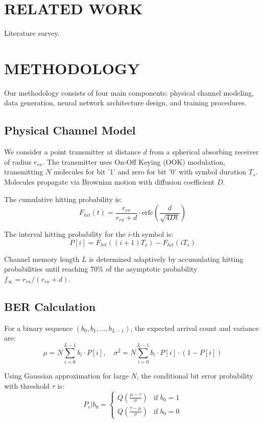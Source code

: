 \documentclass[a4paper,12pt]{report}
\begin{document}
\chapter{RELATED WORK}
Literature survey.

\chapter{METHODOLOGY}

Our methodology consists of four main components: physical channel modeling, data generation, neural network architecture design, and training procedures.

\section{Physical Channel Model}

We consider a point transmitter at distance $d$ from a spherical absorbing receiver of radius $r_{rx}$. The transmitter uses On-Off Keying (OOK) modulation, transmitting $N$ molecules for bit '1' and zero for bit '0' with symbol duration $T_s$. Molecules propagate via Brownian motion with diffusion coefficient $D$.

The cumulative hitting probability is:
\begin{equation}
F_{hit}(t) = \frac{r_{rx}}{r_{rx} + d} \cdot \text{erfc}\left(\frac{d}{\sqrt{4Dt}}\right)
\end{equation}

The interval hitting probability for the $i$-th symbol is:
\begin{equation}
P[i] = F_{hit}((i+1)T_s) - F_{hit}(iT_s)
\end{equation}

Channel memory length $L$ is determined adaptively by accumulating hitting probabilities until reaching 70\% of the asymptotic probability $f_{\infty} = r_{rx}/(r_{rx} + d)$.

\section{BER Calculation}

For a binary sequence $(b_0, b_1, \ldots, b_{L-1})$, the expected arrival count and variance are:
\begin{equation}
\mu = N \sum_{i=0}^{L-1} b_i \cdot P[i], \quad \sigma^2 = N \sum_{i=0}^{L-1} b_i \cdot P[i] \cdot (1 - P[i])
\end{equation}

Using Gaussian approximation for large $N$, the conditional bit error probability with threshold $\tau$ is:
\begin{equation}
P_e | b_0 =
\begin{cases}
Q\left(\frac{\mu - \tau}{\sigma}\right) & \text{if } b_0 = 1 \\
Q\left(\frac{\tau - \mu}{\sigma}\right) & \text{if } b_0 = 0
\end{cases}
\end{equation}
\end{document}
